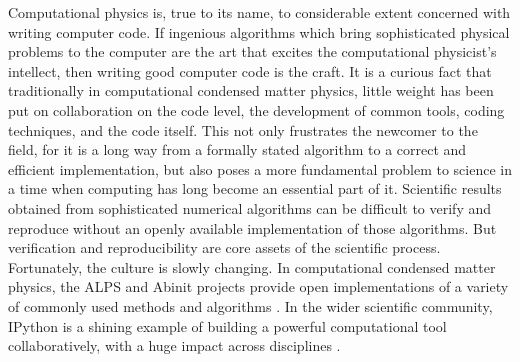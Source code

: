 Computational physics is, true to its name, to considerable extent concerned
with writing computer code. If ingenious algorithms which bring sophisticated
physical problems to the computer are the art that excites the computational
physicist's intellect, then writing good computer code is the craft. It is a
curious fact that traditionally in computational condensed matter physics,
little weight has been put on collaboration on the code level, the development
of common tools, coding techniques, and the code itself. This not only
frustrates the newcomer to the field, for it is a long way from a formally
stated algorithm to a correct and efficient implementation, but also poses a
more fundamental problem to science in a time when computing has long become an
essential part of it. Scientific results obtained from sophisticated numerical
algorithms can be difficult to verify and reproduce without an openly available
implementation of those algorithms. But verification and reproducibility are
core assets of the scientific process. Fortunately, the culture is slowly
changing. In computational condensed matter physics, the ALPS and Abinit
projects provide open implementations of a variety of commonly used methods and
algorithms \cite{bauer2011alps} \cite{gonze2009abinit}. In the wider scientific
community, IPython is a shining example of building a powerful computational
tool collaboratively, with a huge impact across disciplines
\cite{perez2007ipython}.

